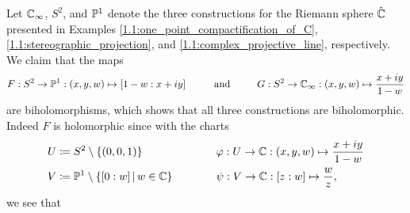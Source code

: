 \documentclass[../Moduli_Spaces_of_Riemann_Surfaces.tex]{subfiles}
\begin{document}
    \begin{example}\label{1.2:exa:biholomorphisms_between_Riemann_spheres}
        Let $\C_\infty$, $S^2$, and $\P^1$ denote the three constructions for the Riemann sphere $\RS$ presented in Examples \ref{1.1:one_point_compactification_of_C}, \ref{1.1:stereographic_projection}, and \ref{1.1:complex_projective_line}, respectively. We claim that the maps
        \begin{equation*}
            F:S^2\to\P^1:\tpl{x,y,w}\mapsto\proje{1-w:x+iy}\ \ \ \ \ \ \ \ \textrm{and}\ \ \ \ \ \ \ \ G:S^2\to\C_\infty:\tpl{x,y,w}\mapsto\frac{x+iy}{1-w}
        \end{equation*}
        are biholomorphisms, which shows that all three constructions are biholomorphic. Indeed $F$ is holomorphic since with the charts
        \begin{equation*}
            \begin{alignedat}{2}
                U&\coloneqq S^2\comp\l\{\l(0,0,1\r)\r\}\ \ \ \ \ \ \ \ \ \ \ \ \ \ \ \ \ \ \ \ &&\phi:U\to\C:\tpl{x,y,w}\mapsto\frac{x+iy}{1-w} \\
                V&\coloneqq\P^1\comp\l\{\proje{0:w}\mid w\in\C\r\}&&\psi:V\to\C:\proje{z:w}\mapsto\frac{w}{z},
            \end{alignedat}
        \end{equation*}
        we see that
        \begin{equation*}

\end{equation*}
\end{example}
\end{document}
